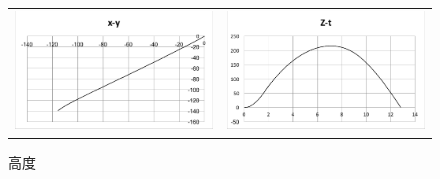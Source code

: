 \documentclass[a4paper]{jarticle}
\begin{document}
\begin{figure}[H]
  \begin{tabular}{cc}
    \centering
    \begin{minipage}{0.45\hsize}
      \includegraphics[scale=0.55]{./x-y.eps}
      \caption{2次元飛翔経路}
    \end{minipage} &
    \begin{minipage}{0.45\hsize}
       \includegraphics[scale=0.55]{./Z.eps}
       \caption{高度}
      \end{minipage}
  \end{tabular}
\end{figure}
\end{document}
